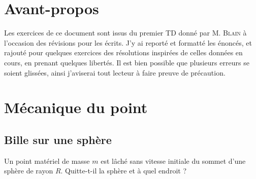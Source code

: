 \documentclass[a4paper,french,bookmarks]{article}
\makeatletter
\renewcommand\tableofcontents{%
    \@starttoc{toc}%
}
\makeatother
\begin{document}
    \section*{Avant-propos}

    \qquad Les exercices de ce document sont issus du premier TD donné par \textsc{M. Blain} à l'occasion des révisions pour les écrits. J'y ai reporté et formatté les énoncés, et rajouté pour quelques exercices des résolutions inspirées de celles données en cours, en prenant quelques libertés. Il est bien possible que plusieurs erreurs se soient glissées, ainsi j'aviserai tout lecteur à faire preuve de précaution.

    \bigskip
    
    \begin{tcolorbox}[
        enhanced,
        frame hidden,
        sharp corners,
        detach title,
        spread outwards,
        halign              = center,
            valign              = center,
        borderline west     = {3pt}{0pt}{main3},
        coltitle            = main3, 
        interior style      = {
            left color      = main1white2!65!gray!11,
            middle color    = main1white2!50!gray!10,
            right color     = main1white2!35!gray!9
        },
        arc                 = 0 cm,
        title               = SOMMAIRE,
        boxrule             = 0pt,
        fonttitle           = \bfseries\sffamily,
        overlay             = {
            \node[rotate=90, minimum width=1cm, anchor=south,yshift=-0.8cm]
            at (frame.west) {\tcbtitle};
        },
    ]
        \begin{minipage}{0.83\linewidth}
            \sffamily
            \tableofcontents
        \end{minipage}
    \end{tcolorbox}

    \bigskip

    \section{Mécanique du point}

    \subsection{Bille sur une sphère}
        
    Un point matériel de masse $m$ est lâché sans vitesse initiale du sommet d'une sphère de rayon $R$. Quitte-t-il la sphère et à quel endroit ?
\end{document}
